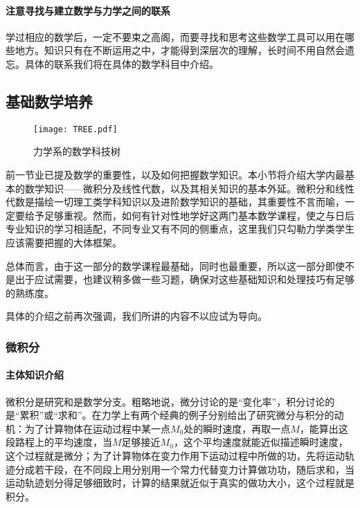\paragraph{注意寻找与建立数学与力学之间的联系}

学过相应的数学后，一定不要束之高阁，而要寻找和思考这些数学工具可以用在哪些地方。知识只有在不断运用之中，才能得到深层次的理解，长时间不用自然会遗忘。具体的联系我们将在具体的数学科目中介绍。


\subsection{基础数学培养}

\begin{figure}[ht]
    \centering
    \texttt{[image: TREE.pdf]}
    \caption{力学系的数学科技树}
    \label{fig:力学系的数学科技树}
\end{figure}

前一节业已提及数学的重要性，以及如何把握数学知识。本小节将介绍大学内最基本的数学知识——微积分及线性代数，以及其相关知识的基本外延。微积分和线性代数是描绘一切理工类学科知识以及进阶数学知识的基础，其重要性不言而喻，一定要给予足够重视。然而，如何有针对性地学好这两门基本数学课程，使之与日后专业知识的学习相适配，不同专业又有不同的侧重点，这里我们只勾勒力学类学生应该需要把握的大体框架。

总体而言，由于这一部分的数学课程最基础，同时也最重要，所以这一部分即使不是出于应试需要，也建议稍多做一些习题，确保对这些基础知识和处理技巧有足够的熟练度。

具体的介绍之前再次强调，我们所讲的内容不以应试为导向。

\subsubsection{微积分}

\paragraph{主体知识介绍}

微积分是研究和是数学分支。粗略地说，微分讨论的是“变化率”，积分讨论的是“累积”或“求和”。在力学上有两个经典的例子分别给出了研究微分与积分的动机：为了计算物体在运动过程中某一点$M_0$处的瞬时速度，再取一点$M$，能算出这段路程上的平均速度，当$M$足够接近$M_0$，这个平均速度就能近似描述瞬时速度，这个过程就是微分；为了计算物体在变力作用下运动过程中所做的功，先将运动轨迹分成若干段，在不同段上用分别用一个常力代替变力计算做功功，随后求和，当运动轨迹划分得足够细致时，计算的结果就近似于真实的做功大小，这个过程就是积分。

